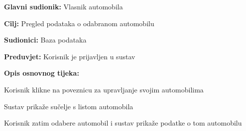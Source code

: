 					\noindent {}
					\begin{packed_item}
						
						\item \textbf{Glavni sudionik: } Vlasnik automobila
						\item  \textbf{Cilj:} Pregled podataka o odabranom automobilu
						\item  \textbf{Sudionici:} Baza podataka
						\item  \textbf{Preduvjet:} Korisnik je prijavljen u sustav
						\item  \textbf{Opis osnovnog tijeka:}
						
						\item[] \begin{packed_enum}
							
							\item Korisnik klikne na poveznicu za upravljanje svojim automobilima
							\item Sustav prikaže sučelje s listom automobila
							\item Korisnik zatim odabere automobil i sustav prikaže podatke o tom automobilu
							
						\end{packed_enum}
					\end{packed_item}
				
